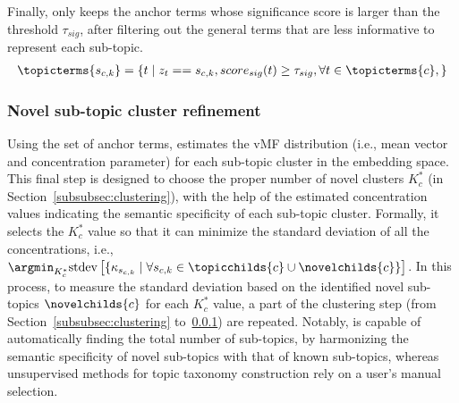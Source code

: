 Finally, \proposed only keeps the anchor terms whose significance score is larger than the threshold $\tau_{{sig}}$,
after filtering out the general terms that are less informative to represent each sub-topic.
\begin{equation}
\begin{split}
\label{eq:termassign}
    \topicterms{s_{c,k}} &= \left\{t\mid z_t==s_{c,k}, score_{sig}(t)\geq\tau_{sig}, \forall t\in\topicterms{c}, \right\} \\
\end{split}
\end{equation}

\subsubsection{Novel sub-topic cluster refinement}
\label{subsubsec:movmf}
Using the set of anchor terms, \proposed estimates the vMF distribution (i.e., mean vector and concentration parameter) for each sub-topic cluster in the embedding space.
This final step is designed to choose the proper number of novel clusters $K_c^*$ (in Section~\ref{subsubsec:clustering}), with the help of the estimated concentration values indicating the semantic specificity of each sub-topic cluster.
Formally, it selects the $K_c^*$ value so that it can minimize the standard deviation of all the concentrations, i.e., $\argmin_{K_c^*} \text{stdev}\left[\{\kappa_{s_{c,k}} \mid \forall s_{c,k}\in\topicchilds{c}\cup\novelchilds{c}\}\right]$.
In this process, to measure the standard deviation based on the identified novel sub-topics $\novelchilds{c}$ for each $K_c^*$ value, a part of the clustering step (from Section~\ref{subsubsec:clustering} to~\ref{subsubsec:movmf}) are repeated.
Notably, \proposed is capable of automatically finding the total number of sub-topics, by harmonizing the semantic specificity of novel sub-topics with that of known sub-topics, whereas unsupervised methods for topic taxonomy construction rely on a user's manual selection.